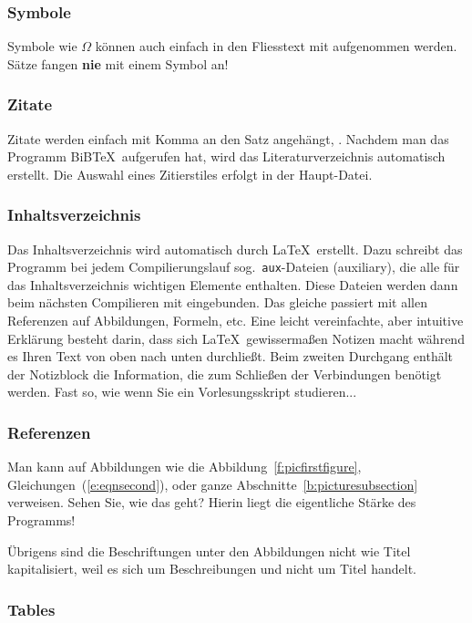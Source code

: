 \subsubsection{Symbole}

Symbole wie $\Omega$ können auch einfach in den Fliesstext mit
aufgenommen werden. Sätze fangen {\bf nie} mit einem Symbol an!


\subsubsection{Zitate}

Zitate werden einfach mit Komma an den Satz angehängt,
\cite{We14}. Nachdem man das Programm BiB\TeX\ aufgerufen hat, wird
das Literaturverzeichnis automatisch erstellt. Die Auswahl eines
Zitierstiles erfolgt in der Haupt-Datei.


\subsubsection{Inhaltsverzeichnis}

Das Inhaltsverzeichnis wird automatisch durch \LaTeX\ erstellt. Dazu
schreibt das Programm bei jedem Compilierungslauf sog.\
\texttt{aux}-Dateien (auxiliary), die alle für das Inhaltsverzeichnis
wichtigen Elemente enthalten. Diese Dateien werden dann beim
nächsten Compilieren mit eingebunden. Das gleiche passiert mit allen
Referenzen auf Abbildungen, Formeln, etc. Eine leicht vereinfachte, aber
intuitive Erklärung besteht darin, dass sich \LaTeX\ gewissermaßen Notizen
macht während es Ihren Text von oben nach unten durchließt. Beim zweiten
Durchgang enthält der Notizblock die Information, die zum Schließen der
Verbindungen benötigt werden. Fast so, wie wenn Sie ein Vorlesungsskript studieren...


\subsubsection{Referenzen}\label{b:subsecrefer}

Man kann auf Abbildungen wie die Abbildung~\ref{f:picfirstfigure}, 
Gleichungen~(\ref{e:eqnsecond}), oder ganze Abschnitte~\ref{b:picturesubsection}
verweisen. Sehen Sie, wie das geht? Hierin liegt die eigentliche
Stärke des Programms!

Übrigens sind die Beschriftungen unter den Abbildungen nicht wie Titel kapitalisiert, weil
es sich um Beschreibungen und nicht um Titel handelt.


\subsubsection{Tables}

